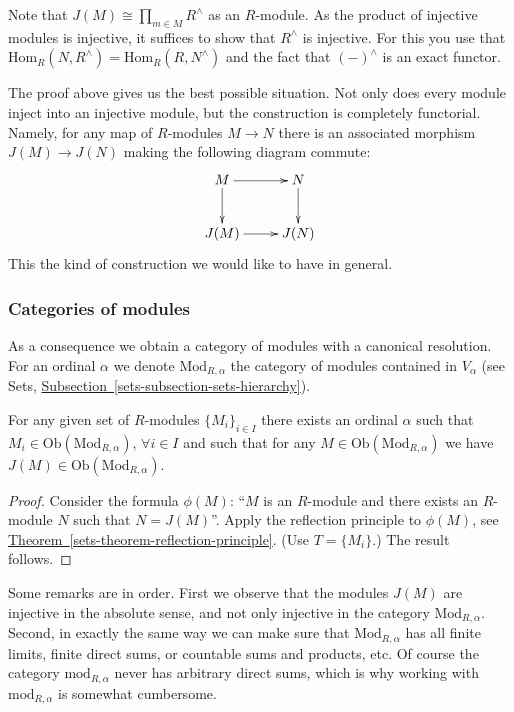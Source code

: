 \smallskip\noindent
Note that $J(M) \cong \prod_{m\in M} R^\wedge$ as an $R$-module.
As the product of injective modules is injective, it suffices to
show that $R^\wedge$ is injective. For this you use that 
$\text{Hom}_R(N, R^\wedge) = \text{Hom}_R(R, N^\wedge)$ and the
fact that $(-)^\wedge$ is an exact functor.

\smallskip\noindent
The proof above gives us the best possible situation. Not only does
every module inject into an injective module, but the construction is
completely functorial. Namely, for any map of $R$-modules $M \to N$ 
there is an associated morphism $J(M) \to J(N)$ making the following 
diagram commute:
$$
\xymatrix{
M \ar[d] \ar[r] & N \ar[d] \\
J(M) \ar[r] & J(N) }
$$
This the kind of construction we would like to have in general.

\subsubsection{Categories of modules}
\label{subsubsection-category-modules}

\noindent
As a consequence we obtain a category of modules with a canonical
resolution. For an ordinal $\alpha$ we denote $\text{Mod}_{R,\alpha}$
the category of modules contained in $V_\alpha$ (see Sets, 
\hyperref[sets-subsection-sets-hierarchy]%
{Subsection~\ref*{sets-subsection-sets-hierarchy}}).

\begin{lemma}
\label{lemma-injective-module-preserves-category}
For any given set of $R$-modules $\{M_i\}_{i\in I}$ there exists an ordinal
$\alpha$ such that $M_i \in \text{Ob}(\text{Mod}_{R,\alpha})$,
$\forall i\in I$ and such that for any
$M \in \text{Ob}(\text{Mod}_{R,\alpha})$ we have
$J(M) \in \text{Ob}(\text{Mod}_{R,\alpha})$.
\end{lemma}

\begin{proof}
Consider the formula $\phi(M)$: ``$M$ is an $R$-module and there exists
an $R$-module $N$ such that $N=J(M)$''. Apply the reflection principle to
$\phi(M)$, see 
\hyperref[sets-theorem-reflection-principle]%
{Theorem~\ref*{sets-theorem-reflection-principle}}. (Use $T = \{M_i\}$.)
The result follows.
\end{proof}

\noindent
Some remarks are in order. First we observe that the modules $J(M)$
are injective in the absolute sense, and not only injective in the
category $\text{Mod}_{R,\alpha}$. Second, in exactly the same way we
can make sure that $\text{Mod}_{R,\alpha}$ has all finite limits,
finite direct sums, or countable sums and products, etc. Of course
the category $\text{mod}_{R,\alpha}$ never has arbitrary direct sums,
which is why working with $\text{mod}_{R,\alpha}$ is somewhat cumbersome.


